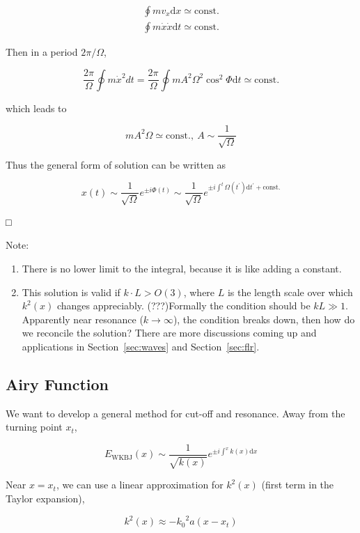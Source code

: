 \documentclass[
  notoc %
]{tufte-book}
\providecommand{\tightlist}{%
  \setlength{\itemsep}{0pt}\setlength{\parskip}{0pt}
}
\begin{document}
\[
\begin{aligned}
\oint mv_x \mathrm{d} x \simeq \text{const.} \\
\oint m\dot{x}\dot{x}\mathrm{d}t \simeq \text{const.}
\end{aligned}
\]

Then in a period \(2\pi/\Omega\),

\[
\frac{2\pi}{\Omega}\oint m\dot{x}^2dt =\frac{2\pi}{\Omega}\oint mA^2 \Omega^2\cos^2\Phi \mathrm{d}t \simeq \text{const.}
\]

which leads to

\[
mA^2\Omega \simeq \text{const.},\ A\sim\frac{1}{\sqrt{\Omega}}
\]

Thus the general form of solution can be written as

\[
x(t)\sim\frac{1}{\sqrt{\Omega}}e^{\pm i \Phi(t)} \sim\frac{1}{\sqrt{\Omega}} e^{\pm i \int^t \Omega(t^\prime)\mathrm{d}t^\prime+\text{const.}}
\]

□

Note:

\begin{enumerate}
\def\labelenumi{\arabic{enumi}.}
\tightlist
\item
  There is no lower limit to the integral, because it is like adding a
  constant.
\item
  This solution is valid if \(k\cdot L > O(3)\), where \(L\) is the
  length scale over which \(k^2(x)\) changes appreciably. (???)Formally
  the condition should be \(kL\gg 1\). Apparently near resonance
  (\(k\rightarrow\infty\)), the condition breaks down, then how do we
  reconcile the solution? There are more discussions coming up and
  applications in Section~\ref{sec:waves} and Section~\ref{sec:flr}.
\end{enumerate}

\hypertarget{sec:airy}{%
\subsection{Airy Function}\label{sec:airy}}

We want to develop a general method for cut-off and resonance. Away from
the turning point \(x_t\),

\[
E_{\text{WKBJ}}(x) \sim \frac{1}{\sqrt{k(x)}}e^{\pm i\int^x k(x)\mathrm{d}x}
\]

Near \(x=x_t\), we can use a linear approximation for \(k^2(x)\) (first
term in the Taylor expansion),

\[
k^2(x) \approx -{k_0}^2 a(x-x_t)
\]
\end{document}
